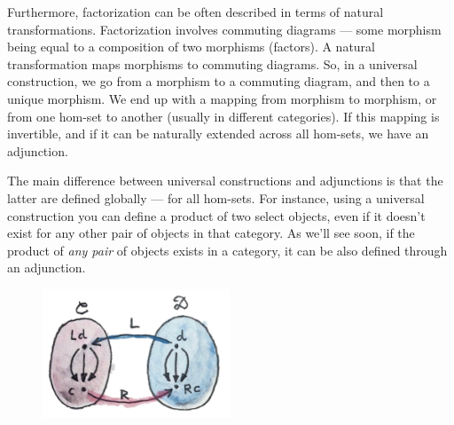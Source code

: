 Furthermore, factorization can be often described in terms of natural
transformations. Factorization involves commuting diagrams --- some
morphism being equal to a composition of two morphisms (factors). A
natural transformation maps morphisms to commuting diagrams. So, in a
universal construction, we go from a morphism to a commuting diagram,
and then to a unique morphism. We end up with a mapping from morphism to
morphism, or from one hom-set to another (usually in different
categories). If this mapping is invertible, and if it can be naturally
extended across all hom-sets, we have an adjunction.

The main difference between universal constructions and adjunctions is
that the latter are defined globally --- for all hom-sets. For instance,
using a universal construction you can define a product of two select
objects, even if it doesn't exist for any other pair of objects in that
category. As we'll see soon, if the product of \emph{any pair} of
objects exists in a category, it can be also defined through an
adjunction.

\begin{figure}[H]
\centering
\includegraphics[width=0.5\textwidth]{images/adj-homsets.jpg}
\end{figure}

